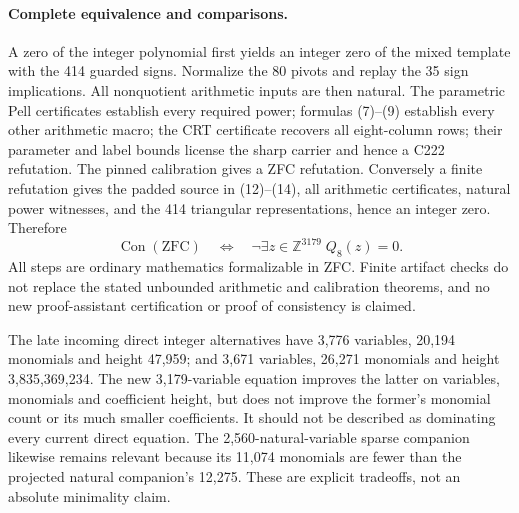 \paragraph{Complete equivalence and comparisons.}
A zero of the integer polynomial first yields an integer zero of the
mixed template with the 414 guarded signs.  Normalize the 80 pivots and
replay the 35 sign implications.  All nonquotient arithmetic inputs are
then natural.  The parametric Pell certificates establish every required
power; formulas (7)--(9) establish every other arithmetic macro; the CRT
certificate recovers all eight-column rows; their parameter and label
bounds license the sharp carrier and hence a C222 refutation.  The pinned
calibration gives a ZFC refutation.  Conversely a finite refutation gives
the padded source in (12)--(14), all arithmetic certificates, natural
power witnesses, and the 414 triangular representations, hence an integer
zero.  Therefore
\[
 \operatorname{Con}(\mathrm{ZFC})
 \quad\Longleftrightarrow\quad
 \neg\exists z\in\mathbb Z^{3179}\;Q_8(z)=0.
\]
All steps are ordinary mathematics formalizable in ZFC.  Finite artifact
checks do not replace the stated unbounded arithmetic and calibration
theorems, and no new proof-assistant certification or proof of consistency
is claimed.

The late incoming direct integer alternatives have 3,776 variables,
20,194 monomials and height 47,959; and 3,671 variables, 26,271 monomials
and height 3,835,369,234.  The new 3,179-variable equation improves the
latter on variables, monomials and coefficient height, but does not
improve the former's monomial count or its much smaller coefficients.
It should not be described as dominating every current direct equation.
The 2,560-natural-variable sparse companion likewise remains relevant
because its 11,074 monomials are fewer than the projected natural
companion's 12,275.  These are explicit tradeoffs, not an absolute
minimality claim.

